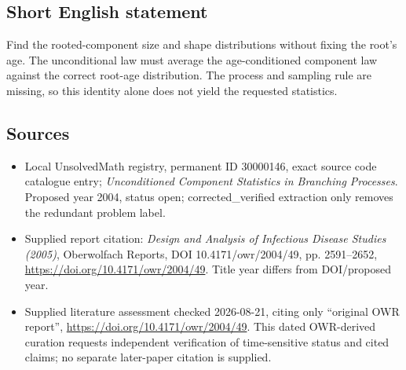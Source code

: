 \documentclass[11pt]{article}
\begin{document}
\subsection{Short English statement}
Find the rooted-component size and shape distributions without fixing the root's age. The unconditional law must average the age-conditioned component law against the correct root-age distribution. The process and sampling rule are missing, so this identity alone does not yield the requested statistics.
\subsection{Sources}
\begin{itemize}
\item Local UnsolvedMath registry, permanent ID 30000146, exact source code catalogue entry; \emph{Unconditioned Component Statistics in Branching Processes}. Proposed year 2004, status open; corrected\_verified extraction only removes the redundant problem label.
\item Supplied report citation: \emph{Design and Analysis of Infectious Disease Studies (2005)}, Oberwolfach Reports, DOI 10.4171/owr/2004/49, pp. 2591--2652, \url{https://doi.org/10.4171/owr/2004/49}. Title year differs from DOI/proposed year.
\item Supplied literature assessment checked 2026-08-21, citing only ``original OWR report'', \url{https://doi.org/10.4171/owr/2004/49}. This dated OWR-derived curation requests independent verification of time-sensitive status and cited claims; no separate later-paper citation is supplied.
\end{itemize}
\end{document}
